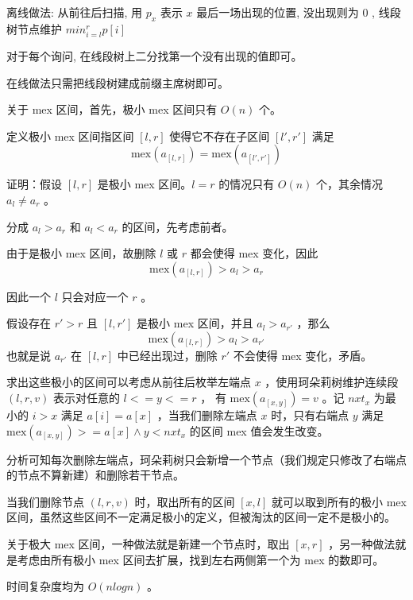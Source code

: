 离线做法: 从前往后扫描, 用 $p_x$ 表示 $x$ 最后一场出现的位置, 没出现则为 $0$ , 线段树节点维护 $min_{i=l}^{r}p[i]$ 

对于每个询问, 在线段树上二分找第一个没有出现的值即可。

在线做法只需把线段树建成前缀主席树即可。

关于 mex 区间，首先，极小 mex 区间只有 $O(n)$ 个。

定义极小 mex 区间指区间 $[l,r]$ 使得它不存在子区间 $[l', r']$ 满足
$$
\text{mex}(a_{[l,r]}) = \text{mex}(a_{[l',r']})
$$

证明：假设 $[l,r]$ 是极小 mex 区间。$l=r$ 的情况只有 $O(n)$ 个，其余情况 $a_l \neq a_r$ 。

分成 $a_l > a_r$ 和 $a_l < a_r$ 的区间，先考虑前者。

由于是极小 mex 区间，故删除 $l$ 或 $r$ 都会使得 mex 变化，因此
$$
\text{mex}(a_{[l,r]}) > a_l > a_r
$$

因此一个 $l$ 只会对应一个 $r$ 。

假设存在 $r' > r$ 且 $[l,r']$ 是极小 mex 区间，并且 $a_l > a_{r'}$ ，那么
$$
\text{mex}(a_{[l,r]}) > a_l > a_{r'}
$$
也就是说 $a_{r'}$ 在 $[l,r]$ 中已经出现过，删除 $r'$ 不会使得 mex 变化，矛盾。

求出这些极小的区间可以考虑从前往后枚举左端点 $x$ ，使用珂朵莉树维护连续段 $(l,r,v)$ 表示对任意的 $l<=y<=r$ ， 
有 $\text{mex}(a_{[x,y]})=v$ 。记 $nxt_x$ 为最小的 $i>x$ 满足 $a[i]=a[x]$ ，当我们删除左端点 $x$ 时，只有右端点 $y$ 满足
$\text{mex}(a_{[x,y]})>=a[x] \land y < nxt_x$ 的区间 mex 值会发生改变。

分析可知每次删除左端点，珂朵莉树只会新增一个节点（我们规定只修改了右端点的节点不算新建）和删除若干节点。

当我们删除节点 $(l,r,v)$ 时，取出所有的区间 $[x,l]$ 就可以取到所有的极小 mex 区间，虽然这些区间不一定满足极小的定义，但被淘汰的区间一定不是极小的。

关于极大 mex 区间，一种做法就是新建一个节点时，取出 $[x,r]$ ，另一种做法就是考虑由所有极小 mex 区间去扩展，找到左右两侧第一个为 mex 的数即可。

时间复杂度均为 $O(nlogn)$ 。